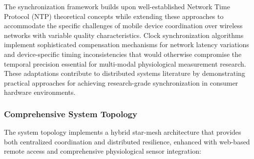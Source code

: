 \documentclass[12pt,a4paper]{article}
\begin{document}
The synchronization framework builds upon well-established Network Time Protocol (NTP) theoretical concepts while
extending these approaches to accommodate the specific challenges of mobile device coordination over wireless networks
with variable quality characteristics. Clock synchronization algorithms implement sophisticated compensation mechanisms
for network latency variations and device-specific timing inconsistencies that would otherwise compromise the temporal
precision essential for multi-modal physiological measurement research. These adaptations contribute to distributed
systems literature by demonstrating practical approaches for achieving research-grade synchronization in consumer
hardware environments.

\subsubsection{Comprehensive System Topology}

The system topology implements a hybrid star-mesh architecture that provides both centralized coordination and
distributed resilience, enhanced with web-based remote access and comprehensive physiological sensor integration:
\end{document}

